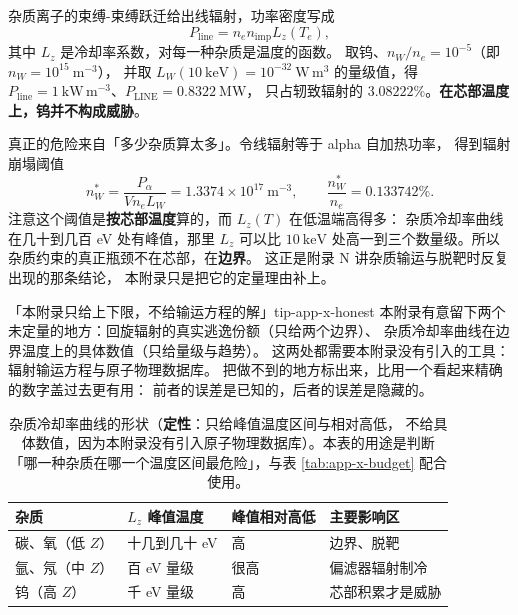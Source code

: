 杂质离子的束缚-束缚跃迁给出线辐射，功率密度写成
\begin{equation}
P_{\mathrm{line}} = n_e n_{\mathrm{imp}} L_z(T_e),
\label{eq:app-x-line2}
\end{equation}
其中 $L_z$ 是冷却率系数，对每一种杂质是温度的函数。
取钨、$n_W/n_e=10^{-5}$（即 $n_W=10^{15}\ \mathrm{m^{-3}}$），
并取 $L_W(10\ \mathrm{keV})=10^{-32}\ \mathrm{W\,m^3}$ 的量级值，得
$P_{\mathrm{line}}=1\ \mathrm{kW\,m^{-3}}$、$P_{\mathrm{LINE}}=0.8322\ \mathrm{MW}$，
只占轫致辐射的 $3.08222\%$。\textbf{在芯部温度上，钨并不构成威胁}。

真正的危险来自「多少杂质算太多」。令线辐射等于 alpha 自加热功率，
得到辐射崩塌阈值
\begin{equation}
n_W^{*} = \frac{P_\alpha}{V n_e L_W} = 1.3374\times10^{17}\ \mathrm{m^{-3}},
\qquad
\frac{n_W^{*}}{n_e} = 0.133742\%.
\label{eq:app-x-collapse}
\end{equation}
注意这个阈值是\textbf{按芯部温度}算的，而 $L_z(T)$ 在低温端高得多：
杂质冷却率曲线在几十到几百 eV 处有峰值，那里 $L_z$ 可以比 $10\ \mathrm{keV}$
处高一到三个数量级。所以杂质约束的真正瓶颈不在芯部，在\textbf{边界}。
这正是附录 N 讲杂质输运与脱靶时反复出现的那条结论，
本附录只是把它的定量理由补上。

\begin{tip}{「本附录只给上下限，不给输运方程的解」}{tip-app-x-honest}
本附录有意留下两个未定量的地方：回旋辐射的真实逃逸份额（只给两个边界）、
杂质冷却率曲线在边界温度上的具体数值（只给量级与趋势）。
这两处都需要本附录没有引入的工具：辐射输运方程与原子物理数据库。
把做不到的地方标出来，比用一个看起来精确的数字盖过去更有用：
前者的误差是已知的，后者的误差是隐藏的。
\end{tip}

\begin{table}[htbp]
\centering
\small
\caption{杂质冷却率曲线的形状（\textbf{定性}：只给峰值温度区间与相对高低，
不给具体数值，因为本附录没有引入原子物理数据库）。本表的用途是判断
「哪一种杂质在哪一个温度区间最危险」，与表 \ref{tab:app-x-budget} 配合使用。}
\label{tab:app-x-impurity}
\begin{tabular}{p{2.8cm}p{3.2cm}p{3.2cm}p{3.4cm}}
\toprule
杂质 & $L_z$ 峰值温度 & 峰值相对高低 & 主要影响区 \\
\midrule
碳、氧（低 $Z$） & 十几到几十 eV & 高 & 边界、脱靶 \\
氩、氖（中 $Z$） & 百 eV 量级 & 很高 & 偏滤器辐射制冷 \\
钨（高 $Z$） & 千 eV 量级 & 高 & 芯部积累才是威胁 \\
\bottomrule
\end{tabular}

\end{table}

